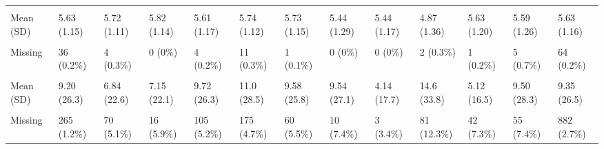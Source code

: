 \documentclass[
  single column]{article}
\begin{document}
\begin{landscape}
\begin{longtable}[t]{lllllllllllll}
\cellcolor{gray!10}{honesty\_humility} & \cellcolor{gray!10}{} & \cellcolor{gray!10}{} & \cellcolor{gray!10}{} & \cellcolor{gray!10}{} & \cellcolor{gray!10}{} & \cellcolor{gray!10}{} & \cellcolor{gray!10}{} & \cellcolor{gray!10}{} & \cellcolor{gray!10}{} & \cellcolor{gray!10}{} & \cellcolor{gray!10}{} & \cellcolor{gray!10}{}\\
Mean (SD) & 5.63 (1.15) & 5.72 (1.11) & 5.82 (1.14) & 5.61 (1.17) & 5.74 (1.12) & 5.73 (1.15) & 5.44 (1.29) & 5.44 (1.17) & 4.87 (1.36) & 5.63 (1.20) & 5.59 (1.26) & 5.63 (1.16)\\
\cellcolor{gray!10}{Median [Min, Max]} & \cellcolor{gray!10}{5.75 [1.00, 7.00]} & \cellcolor{gray!10}{6.00 [1.25, 7.00]} & \cellcolor{gray!10}{6.00 [2.00, 7.00]} & \cellcolor{gray!10}{5.75 [1.00, 7.00]} & \cellcolor{gray!10}{6.00 [1.00, 7.00]} & \cellcolor{gray!10}{6.00 [1.00, 7.00]} & \cellcolor{gray!10}{5.50 [1.50, 7.00]} & \cellcolor{gray!10}{5.67 [2.00, 7.00]} & \cellcolor{gray!10}{5.00 [1.00, 7.00]} & \cellcolor{gray!10}{6.00 [1.00, 7.00]} & \cellcolor{gray!10}{5.75 [1.00, 7.00]} & \cellcolor{gray!10}{5.75 [1.00, 7.00]}\\
Missing & 36 (0.2\%) & 4 (0.3\%) & 0 (0\%) & 4 (0.2\%) & 11 (0.3\%) & 1 (0.1\%) & 0 (0\%) & 0 (0\%) & 2 (0.3\%) & 1 (0.2\%) & 5 (0.7\%) & 64 (0.2\%)\\
\addlinespace
\cellcolor{gray!10}{hours\_children} & \cellcolor{gray!10}{} & \cellcolor{gray!10}{} & \cellcolor{gray!10}{} & \cellcolor{gray!10}{} & \cellcolor{gray!10}{} & \cellcolor{gray!10}{} & \cellcolor{gray!10}{} & \cellcolor{gray!10}{} & \cellcolor{gray!10}{} & \cellcolor{gray!10}{} & \cellcolor{gray!10}{} & \cellcolor{gray!10}{}\\
Mean (SD) & 9.20 (26.3) & 6.84 (22.6) & 7.15 (22.1) & 9.72 (26.3) & 11.0 (28.5) & 9.58 (25.8) & 9.54 (27.1) & 4.14 (17.7) & 14.6 (33.8) & 5.12 (16.5) & 9.50 (28.3) & 9.35 (26.5)\\
\cellcolor{gray!10}{Median [Min, Max]} & \cellcolor{gray!10}{0 [0, 168]} & \cellcolor{gray!10}{0 [0, 168]} & \cellcolor{gray!10}{0 [0, 168]} & \cellcolor{gray!10}{0 [0, 168]} & \cellcolor{gray!10}{0 [0, 168]} & \cellcolor{gray!10}{0 [0, 168]} & \cellcolor{gray!10}{0 [0, 168]} & \cellcolor{gray!10}{0 [0, 150]} & \cellcolor{gray!10}{0 [0, 168]} & \cellcolor{gray!10}{0 [0, 168]} & \cellcolor{gray!10}{0 [0, 168]} & \cellcolor{gray!10}{0 [0, 168]}\\
Missing & 265 (1.2\%) & 70 (5.1\%) & 16 (5.9\%) & 105 (5.2\%) & 175 (4.7\%) & 60 (5.5\%) & 10 (7.4\%) & 3 (3.4\%) & 81 (12.3\%) & 42 (7.3\%) & 55 (7.4\%) & 882 (2.7\%)\\

\end{longtable}
\end{landscape}
\end{document}

